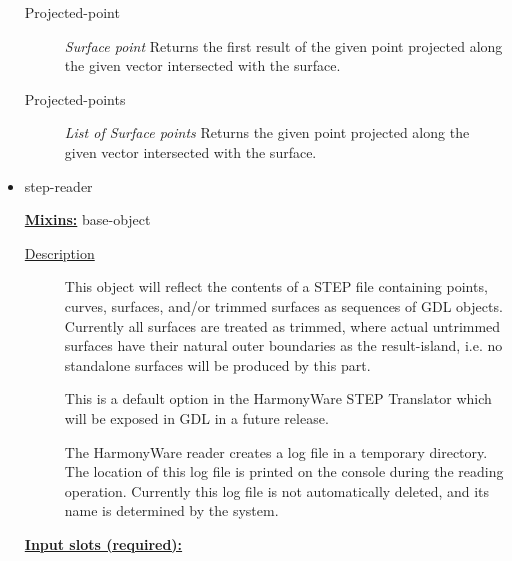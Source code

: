 \documentclass [11pt]{book}
\begin{document}
\begin{itemize}
\begin{description}

\item [Projected-point]
\emph{Surface point} Returns the first result of the given point projected
along the given vector intersected with the surface.


\item [Projected-points]
\emph{List of Surface points} Returns the given point projected along
the given vector intersected with the surface.


\end{description}







\item {}step-reader


\textbf{
\underline{Mixins:}} base-object





\begin{description}

\item [
\underline{Description}]


This object will reflect the contents of a STEP file containing
points, curves, surfaces, and/or trimmed surfaces as sequences of GDL objects. Currently all
surfaces are treated as trimmed, where actual untrimmed surfaces have their natural outer 
boundaries as the result-island, i.e. no standalone surfaces will be produced by this part. 

This is a default option in the HarmonyWare STEP Translator which will be exposed in GDL
in a future release.

The HarmonyWare reader creates a log file in a temporary directory. The location of this log
file is printed on the console during the reading operation. Currently this log file is
not automatically deleted, and its name is determined by the system.





\end{description}








\textbf{
\underline{Input slots (required):}}

\begin{description}


\end{description}
\end{itemize}
\end{document}
